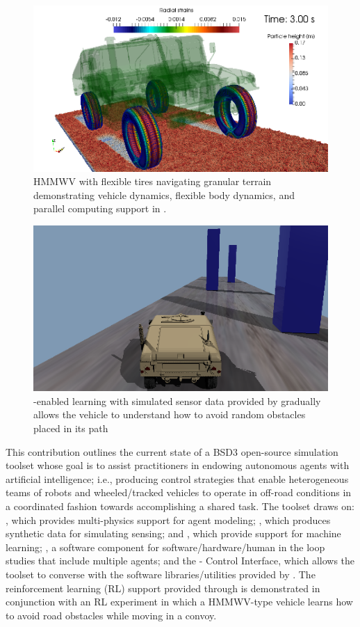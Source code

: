 \begin{figure}
    \centering
    \includegraphics[width=0.8\columnwidth]{Figs/HMMWV-Granular.png}
    \caption{{\small HMMWV with flexible tires navigating granular terrain demonstrating vehicle dynamics, flexible body dynamics, and parallel computing support in \chrono{}.}}   
    \label{fig:hmmwvgranular}
\end{figure}

\begin{figure}
    \centering
    \includegraphics[width=0.8\columnwidth]{Figs/GymChrono-Pilars.png}
    \caption{{\small \gymchrono{}-enabled learning with simulated sensor data provided by  gradually allows the vehicle to understand how to avoid random obstacles placed in its path}}   
    \label{fig:gymchronopillars}
\end{figure}


This contribution outlines the current state of a BSD3 open-source simulation toolset whose goal is to assist practitioners in endowing autonomous agents with artificial intelligence; i.e., producing control strategies that enable heterogeneous teams of robots and wheeled/tracked vehicles to operate in off-road conditions in a coordinated fashion towards accomplishing a shared task. The toolset draws on: \chrono{} , which provides multi-physics support for agent modeling; , which produces synthetic data for simulating sensing; \pychrono{} and \gymchrono{}, which provide support for machine learning; \synchrono{}, a software component for software/hardware/human in the loop studies that include multiple agents; and the \ros{}-\chrono{} Control Interface, which allows the toolset to converse with the software libraries/utilities provided by \ros{} . The reinforcement learning (RL) support provided through \gymchrono{} is demonstrated in conjunction with an RL experiment in which a HMMWV-type vehicle learns how to avoid road obstacles while moving in a convoy.


